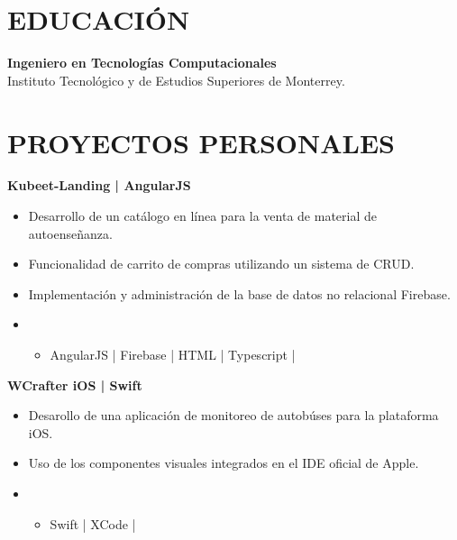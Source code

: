\documentclass{res}
\begin{document}
\address{
}

\begin{resume}
    \separator

    \section{\large{EDUCACIÓN}} 
    \textbf{Ingeniero en Tecnologías Computacionales} 
     \\
    Instituto Tecnológico y de Estudios Superiores de Monterrey.
    
    \longjump

    \section{\large{PROYECTOS PERSONALES}} 
    \textbf{Kubeet-Landing | AngularJS} 
    \begin{itemize}
        \item Desarrollo de un catálogo en línea para la venta de material de autoenseñanza.
        \item Funcionalidad de carrito de compras utilizando un sistema de CRUD.
        \item Implementación y administración de la base de datos no relacional Firebase.
        \item {}
        \begin{itemize}
            \item AngularJS | Firebase | HTML | Typescript |
        \end{itemize}
    \end{itemize}

    \textbf{WCrafter iOS | Swift} 
    \begin{itemize}
        \item Desarollo de una aplicación de monitoreo de autobúses para la plataforma iOS.
        \item Uso de los componentes visuales integrados en el IDE oficial de Apple.
        \item {}
        \begin{itemize}
            \item Swift | XCode |
        \end{itemize}
    \end{itemize}


\end{resume}
\end{document}
